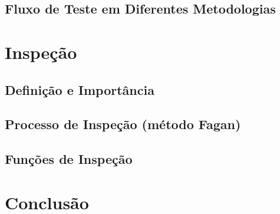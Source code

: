 \documentclass[
	12pt,				%
	openright,			%
	twoside,			%
	a4paper,			%
	english,			%
	brazil,				%
	]{abntex2}
\begin{document}
\section{Fluxo de Teste em Diferentes Metodologias}

\chapter{Inspeção}

\section{Definição e Importância}

\section{Processo de Inspeção (método Fagan)}

\section{Funções de Inspeção}

% 

\chapter*[Conclusão]{Conclusão}

\lipsum[31-33]

\postextual


%


%
%


\printindex
\end{document}
